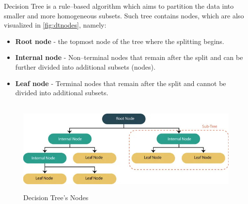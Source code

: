 Decision Tree is a rule--based algorithm which aims to partition the data into smaller and more homogeneous subsets. Such tree contains nodes, which are also visualized in \autoref{fig:dtnodes}, namely:
\begin{itemize}\setlength\itemsep{0em}
	\item \textbf{Root node} - the topmost node of the tree where the splitting begins.
	\item \textbf{Internal node} - Non--terminal nodes that remain after the split and can be further divided into additional subsets (nodes).
	\item \textbf{Leaf node} - Terminal nodes that remain after the split and cannot be divided into additional subsets.
\end{itemize}
\begin{figure}[H]
    \centering
    \caption{Decision Tree's Nodes}\vspace{0.5em}
    \label{fig:dtnodes}\
    \includegraphics[width=130mm]{Figures/dtnodes.jpg}
    \vspace{-1em}
\end{figure}

